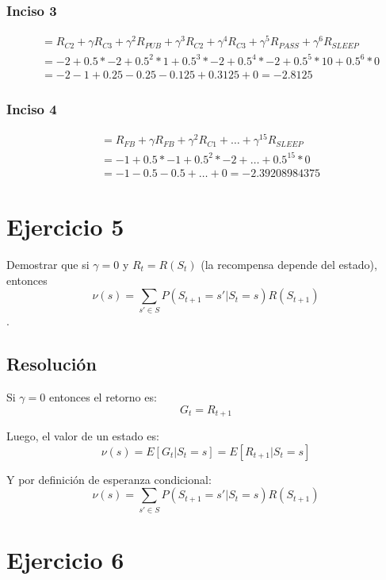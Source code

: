 \documentclass[12pt,a4paper]{article}
\begin{document}
\subsubsection{Inciso 3}
\begin{align}
\tag{1} &= R_{C2} + \gamma R_{C3} + \gamma^2 R_{PUB} + \gamma^3 R_{C2} + \gamma^4 R_{C3} + \gamma^5 R_{PASS} + \gamma^6 R_{SLEEP} \\
\tag{2} &= -2      + 0.5 * -2      + 0.5^2 * 1      + 0.5^3 * -2      + 0.5^4 * -2      + 0.5^5 * 10         + 0.5^6 * 0 \\
\tag{3} &= -2      -1              + 0.25           -0.25             -0.125            + 0.3125          + 0 = -2.8125
\end{align}

\subsubsection{Inciso 4}
\begin{align}
\tag{1} &= R_{FB} + \gamma R_{FB} + \gamma^2 R_{C1} + \dots + \gamma^{15} R_{SLEEP} \\
\tag{2} &= -1      + 0.5 * -1      + 0.5^2 * -2      + \dots + 0.5^{15} * 0 \\
\tag{3} &= -1      -0.5            -0.5              + \dots + 0 = -2.39208984375
\end{align}

\section{Ejercicio 5}

Demostrar que si $\gamma = 0$ y $R_t = R(S_t)$ (la recompensa depende del estado), entonces
$$ \nu(s) = \sum_{s' \in S} P(S_{t+1} = s'| S_t = s) R(S_{t+1})$$.

\subsection{Resolución}

Si $\gamma = 0$ entonces el retorno es:
$$ G_t = R_{t+1} $$

Luego, el valor de un estado es:
$$ \nu(s) = E[G_t | S_t = s] = E[R_{t+1} | S_t = s] $$

Y por definición de esperanza condicional:
$$ \nu(s) = \sum_{s' \in S} P(S_{t+1} = s'| S_t = s) R(S_{t+1})$$

\section{Ejercicio 6}
\end{document}
